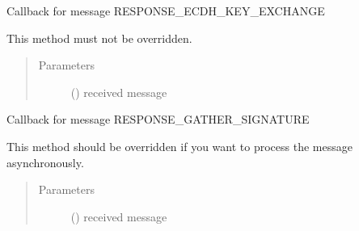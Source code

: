 \documentclass[letterpaper,10pt,english]{sphinxmanual}
\begin{document}
\begin{fulllineitems}
\begin{fulllineitems}
\begin{quote}
\begin{description}
\end{description}\end{quote}

\end{fulllineitems}


\begin{fulllineitems}
\label{\detokenize{bbc1.core.bbc_app:bbc1.core.bbc_app.Callback.proc_resp_ecdh_key_exchange}}
Callback for message RESPONSE\_ECDH\_KEY\_EXCHANGE

This method must not be overridden.
\begin{quote}\begin{description}
\item[{Parameters}] \leavevmode
{} () \textendash{} received message

\end{description}\end{quote}

\end{fulllineitems}


\begin{fulllineitems}
\label{\detokenize{bbc1.core.bbc_app:bbc1.core.bbc_app.Callback.proc_resp_gather_signature}}
Callback for message RESPONSE\_GATHER\_SIGNATURE

This method should be overridden if you want to process the message asynchronously.
\begin{quote}\begin{description}
\item[{Parameters}] \leavevmode
{} () \textendash{} received message

\end{description}\end{quote}

\end{fulllineitems}



\end{fulllineitems}
\end{document}
